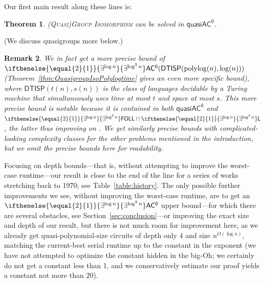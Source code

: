 \documentclass{article}
\newtheorem{theorem}{Theorem}\newtheorem{lemma}[theorem]{Lemma}\newtheorem{proposition}[theorem]{Proposition}\newtheorem{corollary}[theorem]{Corollary}\newtheorem{definition}[theorem]{Definition}\newtheorem{claim}[theorem]{Claim}\newtheorem{remark}[theorem]{Remark}\newtheorem{observation}[theorem]{Observation}\newtheorem{conjecture}[theorem]{Conjecture}\newtheorem{example}[theorem]{Example}
\newcommand{\algprobm}[1]{\textsc{#1}\xspace}
\newcommand{\betacc}[1]{\ifthenelse{\equal{#1}{1}}{\exists^{\log n}}{\exists^{\log^{#1}n}}} %
\newcommand{\Oh}{O}
\newcommand*{\ComplexityClass}[1]{\ensuremath{\mathsf{#1}}\xspace}
\newcommand{\DTISP}{\ComplexityClass{DTISP}}
\newcommand{\DTISPpll}{\ensuremath{\DTISP(\mathrm{polylog}(n),\mathrm{log}(n))}\xspace}
\newcommand*{\LogSpace}{\ComplexityClass{L}}
\newcommand{\ACz}{\ComplexityClass{AC^0}}
\newcommand{\qACz}{\ComplexityClass{quasiAC^0}}
\newcommand{\FOLL}{\ComplexityClass{FOLL}}
\begin{document}
Our first main result along these lines is:

\begin{theorem}
\algprobm{(Quasi)Group Isomorphism} can be solved in $\qACz$.
\end{theorem}

(We discuss quasigroups more below.) 

\begin{remark}
We in fact get a more precise bound of $\betacc{2}\ACz(\DTISPpll)$ (Theorem~\ref{thm:QuasigroupIsoPolylogtime} gives an even more specific bound), where $\mathsf{DTISP}(t(n),s(n))$ is the class of languages decidable by a Turing machine that simultaneously uses time at most $t$ and space at most $s$. This more precise bound is notable because it is contained in both $\qACz$ and $\betacc{2}\FOLL \cap \betacc{2} \LogSpace$, the latter thus improving on \cite{ChattopadhyayToranWagner}. We get similarly precise bounds with complicated-looking complexity classes for the other problems mentioned in the introduction, but we omit the precise bounds here for readability.
\end{remark}

  Focusing on depth bounds---that is, without attempting to improve the worst-case runtime---our result is close to the end of the line for a series of works stretching back to 1970; see Table~\ref{table:history}. The only possible further improvements we see, without improving the worst-case runtime, are to get an $\betacc{2}\ACz$ upper bound---for which there are several obstacles, see Section~\ref{sec:conclusion}---or improving the exact size and depth of our result, but there is not much room for improvement here, as we already get quasi-polynomial-size circuits of depth only 4 and size $n^{\Oh(\log n)}$, matching the current-best serial runtime up to the constant in the exponent (we have not attempted to optimize the constant hidden in the big-Oh; we certainly do not get a constant less than 1, and we conservatively estimate our proof yields a constant not more than $20$).
\end{document}
